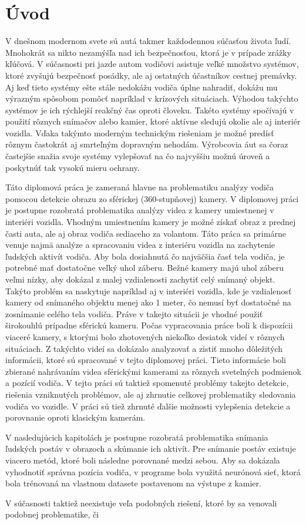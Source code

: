\documentclass[slovak,master,dept460,male,cpp,cpdeclaration]{diploma}
\begin{document}
\MakeTitlePages

\section{Úvod}
\label{sec:Introduction}
V dnešnom modernom svete sú autá takmer každodennou súčasťou života ľudí. Mnohokrát sa nikto nezamýšľa nad ich bezpečnosťou, ktorá je v prípade zrážky kľúčová. V súčasnosti pri jazde autom vodičovi asistuje veľké množstvo systémov, ktoré zvyšujú bezpečnosť posádky, ale aj ostatných účastníkov cestnej premávky. Aj keď tieto systémy ešte stále nedokážu vodiča úplne nahradiť, dokážu mu výrazným spôsobom pomôcť napríklad v krízových situáciach. Výhodou takýchto systémov je ich rýchlejší reakčný čas oproti človeku. Takéto systémy spočívajú v použití rôznych snímačov alebo kamier, ktoré aktívne sledujú okolie ale aj interiér vozidla. Vďaka takýmto moderným technickým riešeniam je možné predísť rôznym  častokrát aj smrteľným dopravným nehodám. Výrobcovia áut sa čoraz častejšie snažia svoje systémy vylepšovať na čo najvyššiu možnú úroveň a poskytnúť tak vysokú mieru ochrany.\par Táto diplomová práca je zameraná hlavne na problematiku analýzy vodiča pomocou detekcie obrazu zo sférickej (360-stupňovej) kamery. V diplomovej práci je postupne rozobratá problematika analýzy videa z kamery umiestnenej v interiéri vozidla. Vhodným umiestnením kamery je možné získať obraz z prednej časti auta, ale aj obraz vodiča sediaceho za volantom. Táto práca sa primárne venuje najmä analýze a spracovaniu videa z interiéru vozidla na zachytenie ľudských aktivít vodiča. Aby bola dosiahnutá čo najväčšia časť tela vodiča, je potrebné mať dostatočne veľký uhol záberu. Bežné kamery majú uhol záberu veľmi nízky, aby dokázal z malej vzdialenosti zachytiť celý snímaný objekt. Takýto problém sa naskytuje napríklad aj v interiéri vozidla, kde je vzdialenosť kamery od snímaného objektu menej ako 1 meter, čo nemusí byť dostatočné na zosnímanie celého tela vodiča. Práve v takejto situácii je vhodné použiť širokouhlú prípadne sférickú kameru. Počas vypracovania práce boli k dispozícii viaceré kamery, s ktorými bolo zhotovených niekoľko desiatok videí v rôznych situáciach. Z takýchto videí sa dokázalo analyzovať a zistiť mnoho dôležitých informácii, ktoré sú spracované v tejto diplomovej práci. Tieto informácie boli zbierané nahrávaním videa sférickými kamerami za rôznych svetelných  podmienok a pozícií vodiča. V tejto práci sú taktiež spomenuté problémy takejto detekcie, riešenia vzniknutých problémov, ale aj zhrnutie celkovej problematiky sledovania vodiča vo vozidle. V práci sú tiež zhrnuté ďalšie možnosti vylepšenia detekcie a porovnanie oproti klasickým kamerám.\par V nasledujúcich kapitolách je postupne rozobratá problematika snímania ľudských postáv v obrazoch a skúmanie ich aktivít. Pre snímanie postáv existuje viacero metód, ktoré boli následne porovnané medzi sebou. Aby sa dokázala vyhodnotiť správna pozícia vodiča, v programe bola využitá neurónová sieť, ktorá bola trénovaná na vlastnom datasete postavenom na výstupe z kamier.\par V súčasnosti taktiež neexistuje veľa podobných riešení, ktoré by sa venovali podobnej problematike, či 
\end{document}
